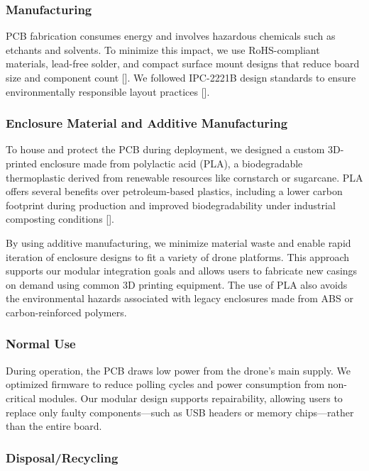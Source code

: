 \documentclass[12pt]{article}
\begin{document}
\subsubsection{Manufacturing}

\par PCB fabrication consumes energy and involves hazardous chemicals such as etchants and solvents. To minimize this impact, we use RoHS-compliant materials, lead-free solder, and compact surface mount designs that reduce board size and component count []. We followed IPC-2221B design standards to ensure environmentally responsible layout practices [].

\subsubsection{Enclosure Material and Additive Manufacturing}

\par To house and protect the PCB during deployment, we designed a custom 3D-printed enclosure made from polylactic acid (PLA), a biodegradable thermoplastic derived from renewable resources like cornstarch or sugarcane. PLA offers several benefits over petroleum-based plastics, including a lower carbon footprint during production and improved biodegradability under industrial composting conditions [].

\par By using additive manufacturing, we minimize material waste and enable rapid iteration of enclosure designs to fit a variety of drone platforms. This approach supports our modular integration goals and allows users to fabricate new casings on demand using common 3D printing equipment. The use of PLA also avoids the environmental hazards associated with legacy enclosures made from ABS or carbon-reinforced polymers.

\subsubsection{Normal Use}

\par During operation, the PCB draws low power from the drone’s main supply. We optimized firmware to reduce polling cycles and power consumption from non-critical modules. Our modular design supports repairability, allowing users to replace only faulty components—such as USB headers or memory chips—rather than the entire board.

\subsubsection{Disposal/Recycling}
\end{document}
